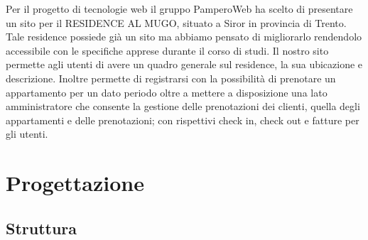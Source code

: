 \documentclass[12pt]{article}
\begin{document}
Per il progetto di tecnologie web il gruppo PamperoWeb ha scelto di presentare un sito per il RESIDENCE AL MUGO, situato a Siror in provincia di Trento. Tale residence possiede già un sito ma abbiamo pensato di migliorarlo rendendolo accessibile con le specifiche apprese durante il corso di studi. Il nostro sito permette agli utenti di avere un quadro generale sul residence, la sua ubicazione e descrizione. Inoltre permette di registrarsi con la possibilità di prenotare un appartamento per un dato periodo oltre a mettere a disposizione una lato amministratore che consente la gestione delle prenotazioni dei clienti, quella degli appartamenti e delle prenotazioni; con rispettivi check in, check out e fatture per gli utenti.

\newpage

\section{Progettazione}

\subsection{Struttura}
\end{document}
